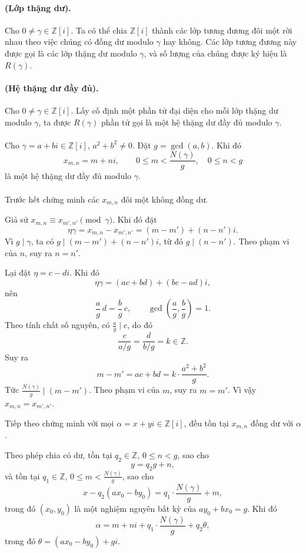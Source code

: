 \documentclass[11pt]{article}
\begin{document}
\paragraph{ (Lớp thặng dư).}
Cho \(0\ne\gamma\in\mathbb Z[i]\). Ta có thể chia \(\mathbb Z[i]\) thành các
lớp tương đương đôi một rời nhau theo việc chúng có đồng dư modulo \(\gamma\)
hay không. Các lớp tương đương này được gọi là các lớp thặng dư modulo
\(\gamma\), và số lượng của chúng được ký hiệu là \(R(\gamma)\).

\paragraph{ (Hệ thặng dư đầy đủ).}
Cho \(0\ne\gamma\in\mathbb Z[i]\). Lấy cố định một phần tử đại diện cho mỗi
lớp thặng dư modulo \(\gamma\), ta được \(R(\gamma)\) phần tử gọi là một hệ
thặng dư đầy đủ modulo \(\gamma\).

\paragraph{}
Cho \(\gamma=a+bi\in\mathbb Z[i]\), \(a^2+b^2\ne0\). Đặt \(g=\gcd(a,b)\).
Khi đó
\[
  x_{m,n}=m+ni,\qquad
  0\le m<\frac{N(\gamma)}g,\quad 0\le n<g
\]
là một hệ thặng dư đầy đủ modulo \(\gamma\).

\paragraph{}
Trước hết chứng minh các \(x_{m,n}\) đôi một không đồng dư.

Giả sử \(x_{m,n}\equiv x_{m',n'}\pmod\gamma\). Khi đó đặt
\[
  \eta\gamma=x_{m,n}-x_{m',n'}=(m-m')+(n-n')i.
\]
Vì \(g\mid\gamma\), ta có \(g\mid (m-m')+(n-n')i\), từ đó
\(g\mid(n-n')\). Theo phạm vi của \(n\), suy ra \(n=n'\).

Lại đặt \(\eta=c-di\). Khi đó
\[
  \eta\gamma=(ac+bd)+(bc-ad)i,
\]
nên
\[
  \frac ag\,d=\frac bg\,c,\qquad \gcd\!\left(\frac ag,\frac bg\right)=1.
\]
Theo tính chất số nguyên, có \(\frac ag\mid c\), do đó
\[
  \frac{c}{a/g}=\frac{d}{b/g}=k\in\mathbb Z.
\]
Suy ra
\[
  m-m'=ac+bd=k\cdot\frac{a^2+b^2}{g}.
\]
Tức \(\frac{N(\gamma)}g\mid(m-m')\). Theo phạm vi của \(m\), suy ra
\(m=m'\). Vì vậy \(x_{m,n}=x_{m',n'}\).

Tiếp theo chứng minh với mọi \(\alpha=x+yi\in\mathbb Z[i]\), đều tồn tại
\(x_{m,n}\) đồng dư với \(\alpha\).

Theo phép chia có dư, tồn tại \(q_2\in\mathbb Z\), \(0\le n<g\), sao cho
\[
  y=q_2g+n,
\]
và tồn tại \(q_1\in\mathbb Z\), \(0\le m<\frac{N(\gamma)}g\), sao cho
\[
  x-q_2(ax_0-by_0)=q_1\cdot\frac{N(\gamma)}g+m,
\]
trong đó \((x_0,y_0)\) là một nghiệm nguyên bất kỳ của \(ay_0+bx_0=g\). Khi
đó
\[
  \alpha=m+ni+q_1\cdot\frac{N(\gamma)}g+q_2\theta,
\]
trong đó \(\theta=(ax_0-by_0)+gi\).
\end{document}
